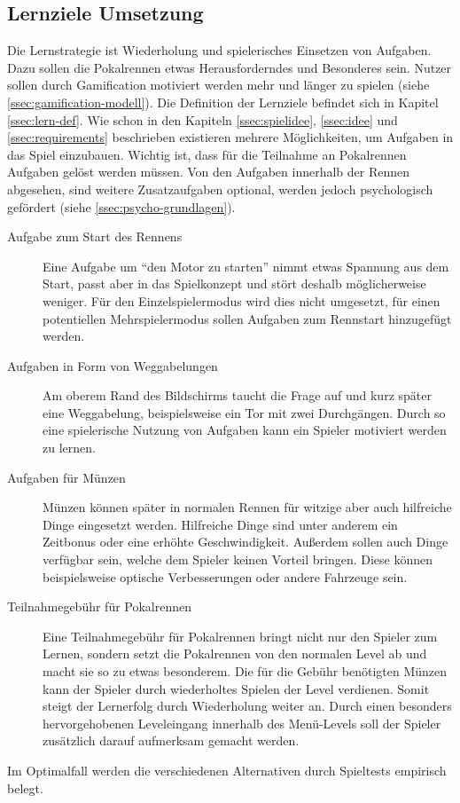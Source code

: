 \subsection{Lernziele Umsetzung}
	Die Lernstrategie ist Wiederholung und spielerisches Einsetzen von Aufgaben. Dazu sollen die Pokalrennen etwas Herausforderndes und Besonderes sein. Nutzer sollen durch Gamification motiviert werden mehr und länger zu spielen (siehe \ref{ssec:gamification-modell}).
	Die Definition der Lernziele befindet sich in Kapitel \ref{ssec:lern-def}.
	Wie schon in den Kapiteln \ref{ssec:spielidee}, \ref{ssec:idee} und \ref{ssec:requirements} beschrieben existieren mehrere Möglichkeiten, um Aufgaben in das Spiel einzubauen. Wichtig ist, dass für die Teilnahme an Pokalrennen Aufgaben gelöst werden müssen. Von den Aufgaben innerhalb der Rennen abgesehen, sind weitere Zusatzaufgaben optional, werden jedoch psychologisch gefördert (siehe \ref{ssec:psycho-grundlagen}).
	\begin{description}
		\item[Aufgabe zum Start des Rennens]{
			Eine Aufgabe um \enquote{den Motor zu starten} nimmt etwas Spannung aus dem Start, passt aber in das Spielkonzept und stört deshalb möglicherweise weniger.
			Für den Einzelspielermodus wird dies nicht umgesetzt, für einen potentiellen Mehrspielermodus sollen Aufgaben zum Rennstart hinzugefügt werden.
		}
		\item[Aufgaben in Form von Weggabelungen]{
			Am oberem Rand des Bildschirms taucht die Frage auf und kurz später eine Weggabelung, beispielsweise ein Tor mit zwei Durchgängen. Durch so eine spielerische Nutzung von Aufgaben kann ein Spieler motiviert werden zu lernen.
		}
		\item[Aufgaben für Münzen]{
			Münzen können später in normalen Rennen für witzige aber auch hilfreiche Dinge eingesetzt werden. Hilfreiche Dinge sind unter anderem ein Zeitbonus oder eine erhöhte Geschwindigkeit. Außerdem sollen auch Dinge verfügbar sein, welche dem Spieler keinen Vorteil bringen. Diese können beispielsweise optische Verbesserungen oder andere Fahrzeuge sein.
		}
		\item[Teilnahmegebühr für Pokalrennen]{
			Eine Teilnahmegebühr für Pokalrennen bringt nicht nur den Spieler zum Lernen, sondern setzt die Pokalrennen von den normalen Level ab und macht sie so zu etwas besonderem. Die für die Gebühr benötigten Münzen kann der Spieler durch wiederholtes Spielen der Level verdienen. Somit steigt der Lernerfolg durch Wiederholung weiter an. Durch einen besonders hervorgehobenen Leveleingang innerhalb des Menü-Levels soll der Spieler zusätzlich darauf aufmerksam gemacht werden.
		}
	\end{description}
	Im Optimalfall werden die verschiedenen Alternativen durch Spieltests empirisch belegt.

